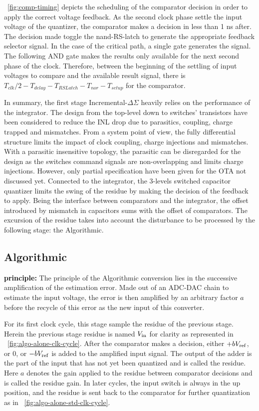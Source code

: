 \figurename~\ref{fig:comp-timing} depicts the scheduling of the comparator decision in order to apply the correct voltage feedback. As the second clock phase settle the input voltage of the quantizer, the comparator makes a decision in less than 1 ns after. The decision made toggle the nand-RS-latch to generate the appropriate feedback selector signal. In the case of the critical path, a single gate generates the signal. The following AND gate makes the results only available for the next second phase of the clock. Therefore, between the beginning of the settling of input voltages to compare and the available result signal, there is \(T_{clk}/2-T_{delay}-T_{RSLatch}-T_{nor}-T_{setup}\) for the comparator.

In summary, the first stage Incremental-$\Delta\Sigma$ heavily relies on the performance of the integrator. The design from the top-level down to switches' transistors have been considered to reduce the INL drop due to parasitics, coupling, charge trapped and mismatches. From a system point of view, the fully differential structure limits the impact of clock coupling, charge injections and mismatches. With a parasitic insensitive topology, the parasitic can be disregarded for the design as the switches command signals are non-overlapping and limits charge injections. However, only partial specification have been given for the OTA not discussed yet.
Connected to the integrator, the 3-levels switched capacitor quantizer limits the swing of the residue by making the decision of the feedback to apply. Being the interface between comparators and the integrator, the offset introduced by mismatch in capacitors sums with the offset of comparators. The excursion of the residue takes into account the disturbance to be processed by the following stage: the Algorithmic.
\clearpage
	 
\subsection{Algorithmic}                    %
\textbf{\textcolor{black}{principle:}}
The principle of the Algorithmic conversion lies in the successive amplification of the estimation error. Made out of an ADC-DAC chain to estimate the input voltage, the error is then amplified by an arbitrary factor $a$ before the recycle of this error as the new input of this converter.

For its first clock cycle, this stage sample the residue of the previous stage. Herein the previous stage residue is named \(V_{\rm in}\) for clarity as represented in \figurename~\ref{fig:algo-alone-clk-cycle}. After the comparator makes a decision, either \(+bV_{\rm ref} \), or 0, or \(-bV_{\rm ref} \) is added to the amplified input signal. The output of the adder is the part of the input that has not yet been quantized and is called the residue. Here \(a\) denotes the gain applied to the residue between comparator decisions and is called the residue gain. In later cycles, the input switch is always in the up position, and the residue is sent back to the comparator for further quantization as in \figurename~\ref{fig:algo-alone-std-clk-cycle}.

